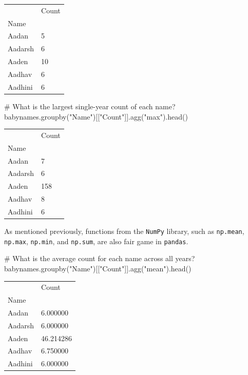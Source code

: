 \documentclass[
  letterpaper,
  DIV=11,
  numbers=noendperiod]{scrreprt}
\newenvironment{Shaded}{\begin{snugshade}}{\end{snugshade}}
\newcommand{\CommentTok}[1]{\textcolor[rgb]{0.37,0.37,0.37}{#1}}
\newcommand{\NormalTok}[1]{\textcolor[rgb]{0.00,0.23,0.31}{#1}}
\newcommand{\StringTok}[1]{\textcolor[rgb]{0.13,0.47,0.30}{#1}}
\begin{document}
\begin{longtable}[]{@{}ll@{}}
\toprule\noalign{}
& Count \\
Name & \\
\midrule\noalign{}
\endhead
\bottomrule\noalign{}
\endlastfoot
Aadan & 5 \\
Aadarsh & 6 \\
Aaden & 10 \\
Aadhav & 6 \\
Aadhini & 6 \\
\end{longtable}

\begin{Shaded}
\begin{Highlighting}[]
\CommentTok{\# What is the largest single{-}year count of each name?}
\NormalTok{babynames.groupby(}\StringTok{"Name"}\NormalTok{)[[}\StringTok{"Count"}\NormalTok{]].agg(}\StringTok{"max"}\NormalTok{).head()}
\end{Highlighting}
\end{Shaded}

\begin{longtable}[]{@{}ll@{}}
\toprule\noalign{}
& Count \\
Name & \\
\midrule\noalign{}
\endhead
\bottomrule\noalign{}
\endlastfoot
Aadan & 7 \\
Aadarsh & 6 \\
Aaden & 158 \\
Aadhav & 8 \\
Aadhini & 6 \\
\end{longtable}

As mentioned previously, functions from the \texttt{NumPy} library, such
as \texttt{np.mean}, \texttt{np.max}, \texttt{np.min}, and
\texttt{np.sum}, are also fair game in \texttt{pandas}.

\begin{Shaded}
\begin{Highlighting}[]
\CommentTok{\# What is the average count for each name across all years?}
\NormalTok{babynames.groupby(}\StringTok{"Name"}\NormalTok{)[[}\StringTok{"Count"}\NormalTok{]].agg(}\StringTok{"mean"}\NormalTok{).head()}
\end{Highlighting}
\end{Shaded}

\begin{longtable}[]{@{}ll@{}}
\toprule\noalign{}
& Count \\
Name & \\
\midrule\noalign{}
\endhead
\bottomrule\noalign{}
\endlastfoot
Aadan & 6.000000 \\
Aadarsh & 6.000000 \\
Aaden & 46.214286 \\
Aadhav & 6.750000 \\
Aadhini & 6.000000 \\
\end{longtable}
\end{document}
